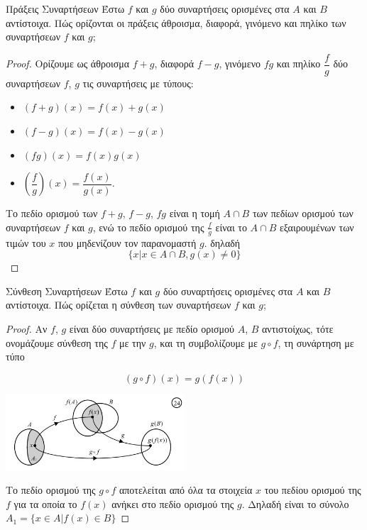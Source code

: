 \documentclass[a4paper, 12pt]{article}
\begin{document}
\begin{theorem}{Πράξεις Συναρτήσεων}
  Έστω $f$ και $g$ δύο συναρτήσεις ορισμένες στα $Α$ και $Β$ αντίστοιχα. Πώς ορίζονται οι πράξεις άθροισμα, διαφορά, γινόμενο και πηλίκο των συναρτήσεων $f$ και $g$;
\end{theorem}
\begin{proof}
  Ορίζουμε ως άθροισμα $f + g$,  διαφορά $f - g$,  γινόμενο $fg$  και  πηλίκο $\dfrac{f}{g}$ δύο συναρτήσεων $f$, $g$ τις συναρτήσεις με τύπους:
  \begin{itemize}
    \item $(f + g)(x) = f(x) + g(x)$
    \item $(f - g)(x) = f(x) - g(x)$
    \item $(fg)(x) = f(x)g(x)$
    \item $\left(\dfrac{f}{g}\right)(x) = \dfrac{f(x)}{g(x)}$.
  \end{itemize}
  Το πεδίο ορισμού των $f+g$, $f-g$, $fg$ είναι η τομή $A \cap B$ των πεδίων ορισμού των συναρτήσεων $f$ και $g$, ενώ το πεδίο ορισμού της $\frac{f}{g}$ είναι το $A \cap B$ εξαιρουμένων των τιμών του $x$ που μηδενίζουν τον παρανομαστή $g$. δηλαδή
  $$ \{ x|x\in A \cap B, g(x) \neq 0 \}$$
\end{proof}

\begin{theorem}{Σύνθεση Συναρτήσεων}
  Έστω $f$ και $g$ δύο συναρτήσεις ορισμένες στα $A$ και $B$ αντίστοιχα. Πώς ορίζεται η σύνθεση των συναρτήσεων $f$ και $g$;
\end{theorem}
\begin{proof}
  Αν $f$, $g$ είναι δύο συναρτήσεις με πεδίο ορισμού $Α$, $Β$ αντιστοίχως, τότε ονομάζουμε σύνθεση της $f$ με την $g$, και τη συμβολίζουμε με $g\circ f$, τη συνάρτηση με τύπο

  $$(g\circ f)(x) = g(f(x))$$


  \begin{center}
    \includegraphics[width=0.5\textwidth]{images/1.2 Σύνθεση}
  \end{center}

  Το πεδίο ορισμού της $g\circ f$ αποτελείται από όλα τα στοιχεία $x$ του πεδίου ορισμού της $f$ για τα οποία το $f(x)$ ανήκει στο πεδίο ορισμού της $g$. Δηλαδή είναι το σύνολο
  $A_1 = \{ x \in A   |   f(x) \in Β\}$
\end{proof}
\end{document}
